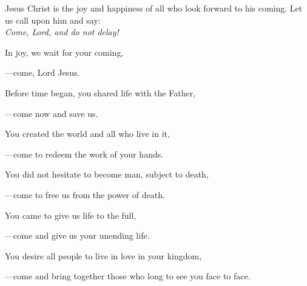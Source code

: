 \intercessions\indent

\begin{hangpar}

Jesus Christ is the joy and happiness of all who look forward to his coming. Let us call upon him and say:\\
\emph{Come, Lord, and do not delay!}

\medskip In joy, we wait for your coming,

{\color{red}---\thinspace}come, Lord Jesus.

\medskip Before time began, you shared life with the Father,

{\color{red}---\thinspace}come now and save us.

\medskip You created the world and all who live in it,

{\color{red}---\thinspace}come to redeem the work of your hands.

\medskip You did not hesitate to become man, subject to death,

{\color{red}---\thinspace}come to free us from the power of death.

\medskip You came to give us life to the full,

{\color{red}---\thinspace}come and give us your unending life.

\medskip You desire all people to live in love in your kingdom,

{\color{red}---\thinspace}come and bring together those who long to see you face to face.

\end{hangpar}